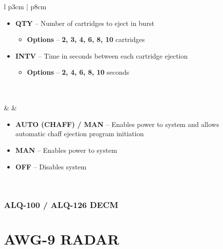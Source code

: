 \documentclass[fontHelvetica, widesubsec]{TechCheck}
\begin{document}
\begin{center}
\begin{longtable}{l p{3cm} | p{8cm}}
			\begin{minipage}[t]{\linewidth}
				\vspace{-7pt}
				\begin{itemize}
					\item \textbf{QTY} -- Number of cartridges to eject in burst
					\begin{itemize}
						\item \textbf{Options} -- \textbf{2, 3, 4, 6, 8, 10} cartridges
					\end{itemize}
					\item \textbf{INTV} -- Time in seconds between each cartridge ejection
					\begin{itemize}
						\item \textbf{Options} -- \textbf{2, 4, 6, 8, 10} seconds
					\end{itemize}
				\end{itemize}
			\end{minipage} \\
			\midrule
			 \\
			\midrule
			\textbf{\textbullet} &   &
			\begin{minipage}[t]{\linewidth}
				\vspace{-7pt}
				\begin{itemize}
					\item \textbf{AUTO (CHAFF) / MAN} -- Enables power to system and allows automatic chaff ejection program initiation
					\item \textbf{MAN} -- Enables power to system
					\item \textbf{OFF} -- Disables system
				\end{itemize}
			\end{minipage} \\
			\bottomrule
		\end{longtable}
	\end{center}

	\subsection{ALQ-100 / ALQ-126 DECM}

	\cleardoublepage

	\chapter{AWG-9 RADAR}
	\minitoc
	\cleardoublepage
\end{document}
